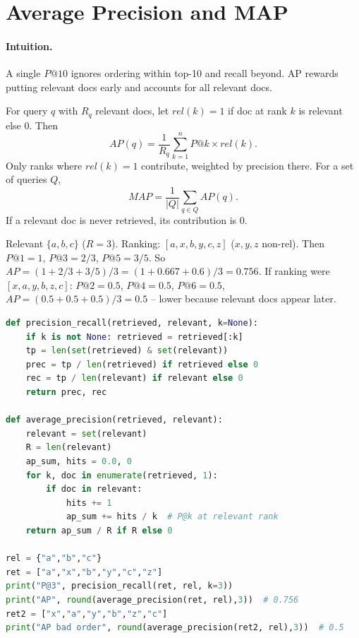 \section{Average Precision and MAP}\label{sec:map}
\paragraph{Intuition.} A single $P@10$ ignores ordering within top-10 and recall beyond. AP rewards putting relevant docs early and accounts for all relevant docs.

\begin{definition}
For query $q$ with $R_q$ relevant docs, let $rel(k)=1$ if doc at rank $k$ is relevant else $0$. Then
\begin{equation}
AP(q)=\frac{1}{R_q}\sum_{k=1}^{n} P@k \times rel(k).
\end{equation}
Only ranks where $rel(k)=1$ contribute, weighted by precision there. For a set of queries $Q$,
\begin{equation}
MAP=\frac{1}{|Q|}\sum_{q\in Q} AP(q).
\end{equation}
If a relevant doc is never retrieved, its contribution is $0$.
\end{definition}

\begin{example}[AP by hand]
Relevant $\{a,b,c\}$ ($R=3$). Ranking: $[a, x, b, y, c, z]$ ($x,y,z$ non-rel). Then $P@1=1$, $P@3=2/3$, $P@5=3/5$. So $AP=(1 + 2/3 + 3/5)/3=(1+0.667+0.6)/3=0.756$. If ranking were $[x, a, y, b, z, c]$: $P@2=0.5$, $P@4=0.5$, $P@6=0.5$, $AP=(0.5+0.5+0.5)/3=0.5$ -- lower because relevant docs appear later.
\end{example}

\begin{lstlisting}[language=Python, caption={Precision, recall, and AP for a single query.}, label={lst:ap}]
def precision_recall(retrieved, relevant, k=None):
    if k is not None: retrieved = retrieved[:k]
    tp = len(set(retrieved) & set(relevant))
    prec = tp / len(retrieved) if retrieved else 0
    rec = tp / len(relevant) if relevant else 0
    return prec, rec

def average_precision(retrieved, relevant):
    relevant = set(relevant)
    R = len(relevant)
    ap_sum, hits = 0.0, 0
    for k, doc in enumerate(retrieved, 1):
        if doc in relevant:
            hits += 1
            ap_sum += hits / k  # P@k at relevant rank
    return ap_sum / R if R else 0

rel = {"a","b","c"}
ret = ["a","x","b","y","c","z"]
print("P@3", precision_recall(ret, rel, k=3))
print("AP", round(average_precision(ret, rel),3))  # 0.756
ret2 = ["x","a","y","b","z","c"]
print("AP bad order", round(average_precision(ret2, rel),3))  # 0.5
\end{lstlisting}

